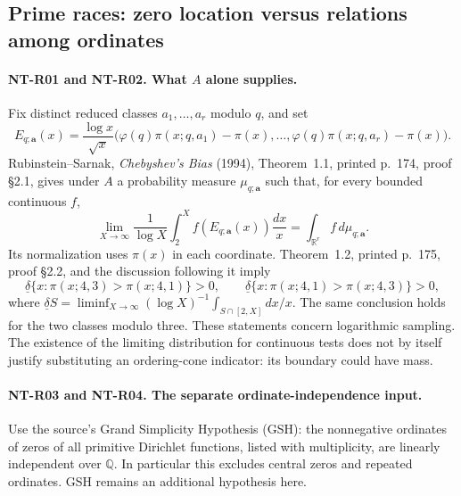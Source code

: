 \subsection{Prime races: zero location versus relations among ordinates}

\paragraph{NT-R01 and NT-R02. What $A$ alone supplies.}
Fix distinct reduced classes $a_1,\ldots,a_r$ modulo $q$, and set
\[
 E_{q;\boldsymbol a}(x)=\frac{\log x}{\sqrt x}
 \bigl(\varphi(q)\pi(x;q,a_1)-\pi(x),\ldots,
       \varphi(q)\pi(x;q,a_r)-\pi(x)\bigr).
\]
Rubinstein--Sarnak, \emph{Chebyshev's Bias} (1994), Theorem~1.1,
printed p.~174, proof \S2.1, gives under $A$ a probability measure
$\mu_{q;\boldsymbol a}$ such that, for every bounded continuous $f$,
\[
 \lim_{X\to\infty}\frac1{\log X}
       \int_2^X f(E_{q;\boldsymbol a}(x))\frac{dx}{x}
   =\int_{\mathbb R^r}f\,d\mu_{q;\boldsymbol a}.
\tag{NT-R01}
\]
Its normalization uses $\pi(x)$ in each coordinate.  Theorem~1.2,
printed p.~175, proof \S2.2, and the discussion following it imply
\[
 \underline\delta\{x:\pi(x;4,3)>\pi(x;4,1)\}>0,
 \qquad
 \underline\delta\{x:\pi(x;4,1)>\pi(x;4,3)\}>0,
\tag{NT-R02}
\]
where $\underline\delta S=\liminf_{X\to\infty}
(\log X)^{-1}\int_{S\cap[2,X]}dx/x$.
The same conclusion holds for the two classes modulo three.
These statements concern logarithmic sampling.  The existence of the
limiting distribution for continuous tests does not by itself justify
substituting an ordering-cone indicator: its boundary could have mass.

\paragraph{NT-R03 and NT-R04. The separate ordinate-independence input.}
Use the source's Grand Simplicity Hypothesis (GSH): the nonnegative
ordinates of zeros of all primitive Dirichlet functions, listed with
multiplicity, are linearly independent over $\mathbb Q$.  In particular
this excludes central zeros and repeated ordinates.  GSH remains an
additional hypothesis here.

